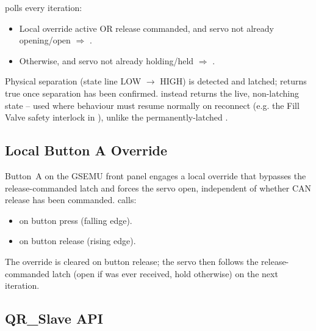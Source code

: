 ﻿\documentclass[11pt,letterpaper]{article}
\begin{document}
 polls every  iteration:

\begin{itemize}[nosep]
  \item Local override active OR release commanded, and servo not already
        opening/open $\Rightarrow$ .
  \item Otherwise, and servo not already holding/held $\Rightarrow$
        .
\end{itemize}

Physical separation (state line LOW $\to$ HIGH) is detected and latched;
 returns true once separation has been confirmed.
 instead returns the live, non-latching state --
used where behaviour must resume normally on reconnect (e.g. the Fill
Valve safety interlock in ), unlike the permanently-latched
.

\subsection{Local Button A Override}

Button~A on the GSEMU front panel engages a local override that bypasses
the release-commanded latch and forces the servo open, independent of
whether CAN release has been commanded.  calls:

\begin{itemize}[nosep]
  \item {} on button press (falling edge).
  \item {} on button release (rising edge).
\end{itemize}

The override is cleared on button release; the servo then follows the
release-commanded latch (open if  was ever received,
hold otherwise) on the next  iteration.

\subsection{QR\_Slave API}
\end{document}
